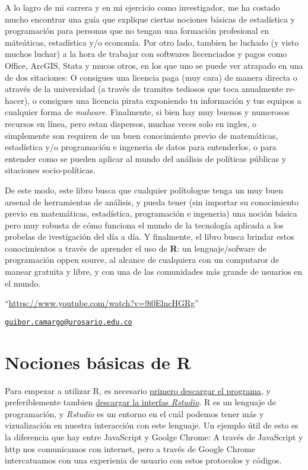 \documentclass[
]{book}
\begin{document}
A lo lagro de mi carrera y en mi ejercicio como investigador, me ha costado mucho encontrar una guía que explique ciertas nociones básicas de estadística y programación para personas que no tengan una formación profesional en máteáticas, estadística y/o economía. Por otro lado, tambien he luchado (y visto muchos luchar) a la hora de trabajar con softwares liecenciados y pagos como Office, ArcGIS, Stata y mucos otros, en los que uno se puede ver atrapado en una de dos sitaciones: O consigues una licencia paga (muy cara) de manera directa o através de la universidad (a través de tramites tediosos que toca anualmente re-hacer), o consigues una licencia pirata exponiendo tu información y tus equipos a cualquier forma de \emph{malware}. Finalmente, si bien hay muy buenos y numerosos recursos en línea, pero estan dispersos, muchas veces solo en ingles, o simplemente son requiren de un buen conocimiento previo de matemáticas, estadística y/o programación e ingeneria de datos para entenderlos, o para entender como se pueden aplicar al mundo del análisis de políticas públicas y sitaciones socio-políticas.

De este modo, este libro busca que cualquier polítologue tenga un muy buen arsenal de herramientas de análisis, y pueda tener (sin importar su conocimiento previo en matemáticas, estadística, programación e ingeneria) una noción básica pero muy robusta de cómo funciona el mundo de la tecnología aplicada a los probelas de ivestigación del día a día. Y finalmente, el libro busca brindar estos conocimientos a través de aprender el uso de \textbf{R}: un lenguaje/sofware de programación oppen source, al alcance de cualquiera con un computaror de manear gratuita y libre, y con una de las comunidades más grande de usuarios en el mundo.

``\url{https://www.youtube.com/watch?v=9i0ElncHGRg}''

\href{mailto:guibor.camargo@urosario.edu.co}{\nolinkurl{guibor.camargo@urosario.edu.co}}

\hypertarget{nociones-buxe1sicas-de-r}{%
\chapter{Nociones básicas de R}\label{nociones-buxe1sicas-de-r}}

Para empezar a utilizar R, es necesario \href{https://cran.r-project.org/bin/windows/base/}{primero descargar el programa}, y preferiblemente tambien \href{https://www.rstudio.com/products/rstudio/download/}{descargar la interfas \emph{Rstudio}}. R es un lenguaje de programación, y \emph{Rstudio} es un entorno en el cuál podemos tener más y vizualización en nuestra interacción con este lenguaje. Un ejemplo útil de esto es la diferencia que hay entre JavaScript y Goolge Chrome: A través de JavaScript y http nos comunicamos con internet, pero a través de Google Chrome intercatuamos con una experienia de usuario con estos protocolos y códigos.
\end{document}
